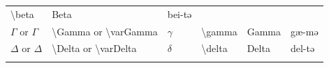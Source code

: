 \documentclass[
]{book}
\begin{document}
\begin{longtable}[]{@{}llllll@{}}
\begin{minipage}[t]{0.17\columnwidth}
\textbackslash beta\strut
\end{minipage} & \begin{minipage}[t]{0.06\columnwidth}\raggedright
Beta\strut
\end{minipage} & \begin{minipage}[t]{0.08\columnwidth}\raggedright
bei-tə\strut
\end{minipage}\tabularnewline
\begin{minipage}[t]{0.18\columnwidth}\raggedright
\(\Gamma\) or \(\varGamma\)\strut
\end{minipage} & \begin{minipage}[t]{0.17\columnwidth}\raggedright
\textbackslash Gamma or \textbackslash varGamma\strut
\end{minipage} & \begin{minipage}[t]{0.18\columnwidth}\raggedright
\(\gamma\)\strut
\end{minipage} & \begin{minipage}[t]{0.17\columnwidth}\raggedright
\textbackslash gamma\strut
\end{minipage} & \begin{minipage}[t]{0.06\columnwidth}\raggedright
Gamma\strut
\end{minipage} & \begin{minipage}[t]{0.08\columnwidth}\raggedright
gæ-mə\strut
\end{minipage}\tabularnewline
\begin{minipage}[t]{0.18\columnwidth}\raggedright
\(\Delta\) or \(\varDelta\)\strut
\end{minipage} & \begin{minipage}[t]{0.17\columnwidth}\raggedright
\textbackslash Delta or \textbackslash varDelta\strut
\end{minipage} & \begin{minipage}[t]{0.18\columnwidth}\raggedright
\(\delta\)\strut
\end{minipage} & \begin{minipage}[t]{0.17\columnwidth}\raggedright
\textbackslash delta\strut
\end{minipage} & \begin{minipage}[t]{0.06\columnwidth}\raggedright
Delta\strut
\end{minipage} & \begin{minipage}[t]{0.08\columnwidth}\raggedright
del-tə\strut
\end{minipage}\tabularnewline
\begin{minipage}[t]{0.18\columnwidth}\raggedright

\end{minipage}
\end{longtable}
\end{document}
